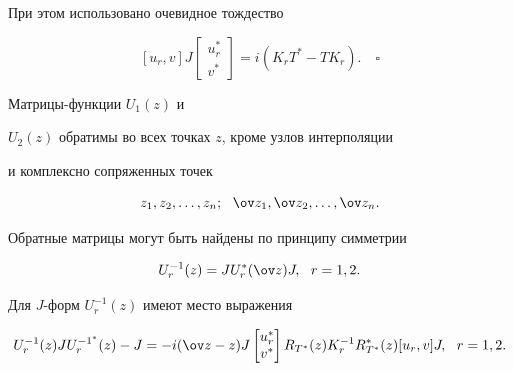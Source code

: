 При этом использовано очевидное тождество


$$


[u_r, v]J \begin{bmatrix} u_r^* \\ v^* \end{bmatrix}=


i(K_r T^{*}- TK_r).\quad\square


$$





\begin{cornonum}


Матрицы-функции $U_1(z)$ и


$U_2(z)$ обратимы во всех точках $z$, кроме узлов интерполяции


и комплексно сопряженных точек


$$


z_1, z_2, \dotsc, z_n;\ \ \ov z_1, \ov z_2, \dotsc,\ov z_n.


$$


Обратные матрицы могут быть найдены по принципу симметрии


\begin{equation}


U_r^{-1}(z)=J U_r^*(\ov z) J, \ \ r=1,2.


\end{equation}


Для $J$-форм $U_r^{-1}(z)$ имеют место выражения


\begin{equation}


U_r^{-1}(z)JU_r^{-1^*}(z)-J


=-i(\ov z -z)J \begin{bmatrix} u_r^* \\ v^* \end{bmatrix}


R_{T^*}(z)K_r^{-1} R_{T^*}^*(z)[u_r, v]J,\ \ r=1,2.


\end{equation}


\end{cornonum}





